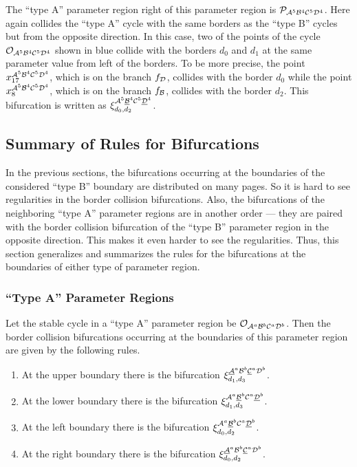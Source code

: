 The ``type A'' parameter region right of this parameter region is $\mathcal{P}_{\mathcal{A}^5\mathcal{B}^4\mathcal{C}^5\mathcal{D}^4}$.
Here again collides the ``type A'' cycle with the same borders as the ``type B'' cycles but from the opposite direction.
In this case, two of the points of the cycle $\mathcal{O}_{\mathcal{A}^5\mathcal{B}^4\mathcal{C}^5\mathcal{D}^4}$ shown in blue collide with the borders $d_0$ and $d_1$ at the same parameter value from left of the borders.
To be more precise, the point $x_{17}^{\mathcal{A}^5\mathcal{B}^4\mathcal{C}^5\mathcal{D}^4}$, which is on the branch $f_{\mathcal{D}}$, collides with the border $d_0$ while the point $x_{8}^{\mathcal{A}^5\mathcal{B}^4\mathcal{C}^5\mathcal{D}^4}$, which is on the branch $f_{\mathcal{B}}$, collides with the border $d_2$.
This bifurcation is written as $\xi_{d_0, d_2}^{\mathcal{A}^5\underline{\mathcal{B}}^4\mathcal{C}^5\underline{\mathcal{D}}^4}$.

\subsection{Summary of Rules for Bifurcations}
\label{sec:arch.bif.sum}

In the previous sections, the bifurcations occurring at the boundaries of the considered ``type B'' boundary are distributed on many pages.
So it is hard to see regularities in the border collision bifurcations.
Also, the bifurcations of the neighboring ``type A'' parameter regions are in another order --- they are paired with the border collision bifurcation of the ``type B'' parameter region in the opposite direction.
This makes it even harder to see the regularities.
Thus, this section generalizes and summarizes the rules for the bifurcations at the boundaries of either type of parameter region.

\clearpage

\subsubsection{``Type A'' Parameter Regions}

Let the stable cycle in a ``type A'' parameter region be $\mathcal{O}_{\mathcal{A}^a\mathcal{B}^b\mathcal{C}^a\mathcal{D}^b}$.
Then the border collision bifurcations occurring at the boundaries of this parameter region are given by the following rules.

\begin{enumerate}
	\item At the upper boundary there is the bifurcation $\xi_{d_1, d_3}^{\underline{\mathcal{A}}^a\mathcal{B}^b\underline{\mathcal{C}}^a\mathcal{D}^b}$.
	\item At the lower boundary there is the bifurcation $\xi_{d_1, d_3}^{\mathcal{A}^a\underline{\mathcal{B}}^b\mathcal{C}^a\underline{\mathcal{D}}^b}$.
	\item At the left boundary there is the bifurcation $\xi_{d_0, d_2}^{\mathcal{A}^a\underline{\mathcal{B}}^b\mathcal{C}^a\underline{\mathcal{D}}^b}$.
	\item At the right boundary there is the bifurcation $\xi_{d_0, d_2}^{\underline{\mathcal{A}}^a\mathcal{B}^b\underline{\mathcal{C}}^a\mathcal{D}^b}$.
\end{enumerate}

